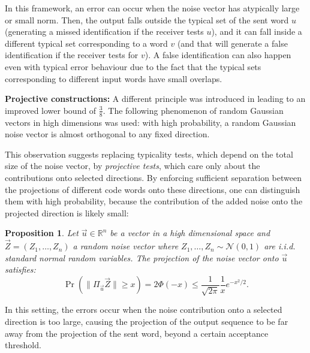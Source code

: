 \documentclass[10pt,conference]{IEEEtran}
\newtheorem{proposition}[theorem]{Proposition}
\newcommand{\1}{\mathds{1}}
\newcommand{\RR}{\mathbb{R}}
\newcommand{\cN}{\mathcal{N}}
\begin{document}
In this framework, an error can occur when the noise vector has atypically large or small norm. Then, the output falls outside the typical set of the sent word $u$ (generating a missed identification if the receiver tests $u$), and it can fall inside a different typical set corresponding to a word $v$ (and that will generate a false identification if the receiver tests for $v$). A false identification can also happen even with typical error behaviour due to the fact that the typical sets corresponding to different input words have small overlaps.


\medskip

\noindent\textbf{Projective constructions:}
A different principle was introduced in \cite{galaxy-codes} leading to an improved lower bound of $\frac38$. The following phenomenon of random Gaussian vectors in high dimensions was used: with high probability, a random Gaussian noise vector is almost orthogonal to any fixed direction.


This observation suggests replacing typicality tests, which depend on the total size of the noise vector, by \emph{projective tests}, which care only about the contributions onto selected directions. By enforcing sufficient separation between the projections of different code words onto these directions, one can distinguish them with high probability, because the contribution of the added noise onto the projected direction is likely small:

\begin{proposition}\label{prop:projection}
    Let $\vec{u}\in\RR^n$ be a vector in a high dimensional space and $\vec{Z}=(Z_1,\dots,Z_n)$ a random noise vector where $Z_1,\dots,Z_n\sim\cN(0,1)$ are i.i.d. standard normal random variables. The projection of the noise vector onto  $\vec{u}$ satisfies:
    \[
    \Pr\left(\|\Pi_{\vec{u}}\vec{Z}\|\geq x\right)=2\Phi(-x)\leq\frac{1}{\sqrt{2\pi}}\frac{1}{x}e^{-x^2/2}.
    \]
\end{proposition}

In this setting, the errors occur when the noise contribution onto a selected direction is too large, causing the projection of the output sequence to be far away from the projection of the sent word, beyond a certain acceptance threshold.
\end{document}
